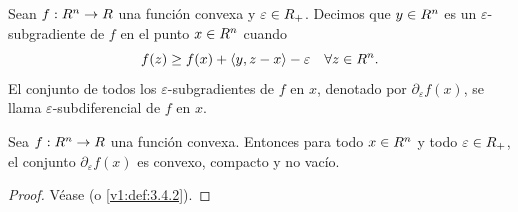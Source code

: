 \begin{definition}\label{v2:def:1.3.5}
    Sean $f : R^n \to R$ una función convexa y $\varepsilon \in R_+$. Decimos que $y \in R^n$ es un $\varepsilon$-subgradiente de $f$ en el punto $x \in R^n$ cuando
    \[
        f(z) \ge f(x) + \langle y, z - x \rangle - \varepsilon \quad \forall z \in R^n.
    \]
    El conjunto de todos los $\varepsilon$-subgradientes de $f$ en $x$, denotado por $\partial_\varepsilon f(x)$, se llama $\varepsilon$-subdiferencial de $f$ en $x$.
\end{definition}

\begin{theorem}\label{v2:thm:1.3.10}
    Sea $f : R^n \to R$ una función convexa. Entonces para todo $x \in R^n$ y todo $\varepsilon \in R_+$, el conjunto $\partial_\varepsilon f(x)$ es convexo, compacto y no vacío.
\end{theorem}

\begin{proof}
    Véase \cite{izmailov2020otimizacaovolume1} (o \cref{v1:def:3.4.2}).
\end{proof}
